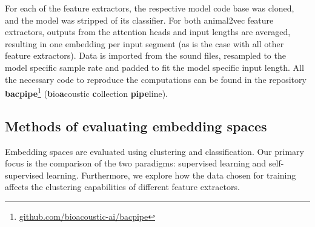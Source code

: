 For each of the feature extractors, the respective model code base was cloned, and the model was stripped of its classifier.
For both animal2vec feature extractors, outputs from the attention heads and input lengths are averaged, resulting in one embedding per input segment (as is the case with all other feature extractors).
Data is imported from the sound files, resampled to the model specific sample rate and padded to fit the model specific input length.
All the necessary code to reproduce the computations can be found in the repository \textbf{bacpipe}\footnote{\url{github.com/bioacoustic-ai/bacpipe}} (\textbf{b}io\textbf{a}coustic \textbf{c}ollection \textbf{pipe}line).

\subsection{Methods of evaluating embedding spaces}
\label{ssub:eval_dim_reduc}

Embedding spaces are evaluated using clustering and classification.
Our primary focus is the comparison of the two paradigms: supervised learning and self-supervised learning.
Furthermore, we explore how the data chosen for training affects the clustering capabilities of different feature extractors.




